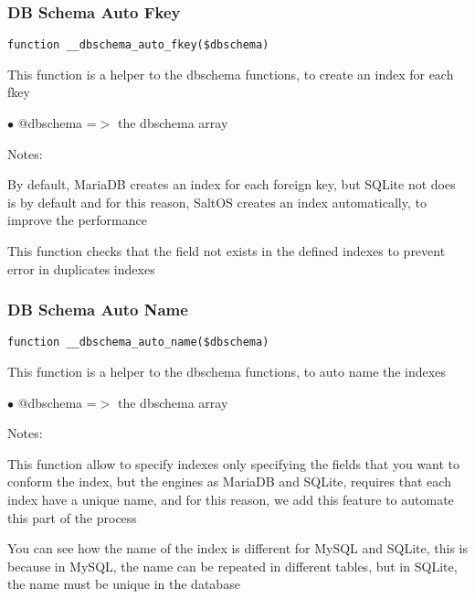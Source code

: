 \documentclass[a4paper]{article}
\begin{document}
\hypertarget{toc423}{}
\subsubsection{DB Schema Auto Fkey}

\begin{lstlisting}
function __dbschema_auto_fkey($dbschema)
\end{lstlisting}

This function is a helper to the dbschema functions, to create an index for each fkey

\begin{compactitem}
\item[\color{myblue}$\bullet$] @dbschema =$>$ the dbschema array
\end{compactitem}

Notes:

By default, MariaDB creates an index for each foreign key, but SQLite not does is by default
and for this reason, SaltOS creates an index automatically, to improve the performance

This function checks that the field not exists in the defined indexes to prevent error in duplicates
indexes

\hypertarget{toc424}{}
\subsubsection{DB Schema Auto Name}

\begin{lstlisting}
function __dbschema_auto_name($dbschema)
\end{lstlisting}

This function is a helper to the dbschema functions, to auto name the indexes

\begin{compactitem}
\item[\color{myblue}$\bullet$] @dbschema =$>$ the dbschema array
\end{compactitem}

Notes:

This function allow to specify indexes only specifying the fields that you want
to conform the index, but the engines as MariaDB and SQLite, requires that each
index have a unique name, and for this reason, we add this feature to automate
this part of the process

You can see how the name of the index is different for MySQL and SQLite, this is
because in MySQL, the name can be repeated in different tables, but in SQLite,
the name must be unique in the database
\end{document}
